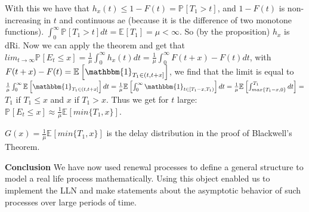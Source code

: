 With this we have that $h_x(t) \leq 1 - F(t) = \mathbb{P}_{} \left[ T_1 > t \right] $, and $1-F(t)$ is non-increasing in $t$ and continuous ae (because it is the difference of two monotone functions). $\int_{0}^{\infty} \mathbb{P}_{} \left[ T_1 > t \right] dt = \mathbb{E}_{} \left[ T_1 \right] = \mu < \infty $. So (by the proposition) $h_x$ is dRi. Now we can apply the theorem and get that $lim_{t \to \infty} \mathbb{P}_{} \left[ E_t \leq x \right] = \frac{1}{\mu } \int_{0}^{\infty} h_x(t)dt = \frac{1}{\mu } \int_{0}^{\infty} F(t+x) - F(t) dt$, with $F(t+x) - F(t) = \mathbb{E}_{} \left[ \mathbbm{1}_{T_1 \in (t, t+x]} \right] $, we find that the limit is equal to $\frac{1}{\mu } \int_{0}^{\infty} \mathbb{E}_{} \left[ \mathbbm{1}_{T_1 \in (t, t+x]} \right]dt = \frac{1}{\mu} \mathbb{E}_{} \left[ \int_{0}^{ \infty } \mathbbm{1}_{t \in [T_1 -x, T_1)}    \right]dt = \frac{1}{\mu } \mathbb{E}_{} \left[ \int_{max\{T_1-x, 0\}}^{T_1} dt \right] =  $ $T_1$ if $T_1 \leq x$ and $x$ if  $T_1 > x$. Thus we get for $t$ large:  $\mathbb{P}_{} \left[ E_t \leq x \right] \approx  \frac{1}{\mu} \mathbb{E}_{} \left[ min\{T_1, x\} \right]  $. 

\begin{rmk}[]
	$G(x) = \frac{1}{\mu } \mathbb{E}_{} \left[ min\{T_1, x\} \right] $ is the delay distribution in the proof of Blackwell's Theorem.
\end{rmk}

\noindent \textbf{Conclusion} We have now used renewal processes to define a general structure to model a real life process mathematically. Using this object enabled us to implement the LLN and make statements about the asymptotic behavior of such processes over large periods of time.


